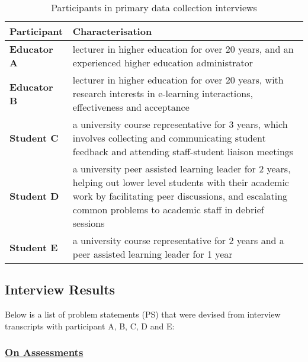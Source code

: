 \begin{table}[!h] 
    \caption{Participants in primary data collection interviews}
    \centering
    \label{table:participants-req}
    \begin{tabularx}{\textwidth}{>{\bfseries}lX}
        Participant & Characterisation\\
        \toprule
        Educator A & lecturer in higher education for over 20 years, and an experienced higher education 
        administrator\\\midrule
        Educator B & lecturer in higher education for over 20 years, with research interests 
        in e-learning interactions, effectiveness and acceptance\\\midrule
        Student C & a university course representative for 3 years, which involves collecting and 
        communicating student feedback and attending staff-student liaison meetings \\\midrule
        Student D & a university peer assisted learning leader for 2 years, helping out lower level 
        students with their academic work by facilitating peer discussions, and escalating common problems
        to academic staff in debrief sessions\\\midrule
        Student E & a university course representative for 2 years and a peer assisted learning leader 
        for 1 year\\\bottomrule
    \end{tabularx}
\end{table}

\subsection{Interview Results}

Below is a list of problem statements (PS) that were devised from interview transcripts with 
participant A, B, C, D and E:

\subsubsection{\underline{On Assessments}}

